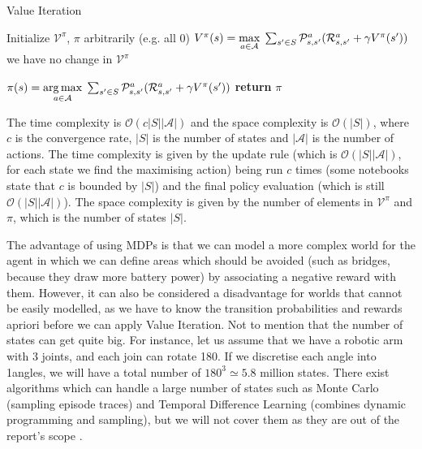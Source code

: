 \begin{algorithm}
\caption{Value Iteration}
\label{alg: value_iteration}
\begin{algorithmic}[1]
    \State Initialize $\mathcal{V^{\pi}}$, $\pi$ arbitrarily (e.g. all 0)
    \State
    \Repeat
            \State $V^{\pi}(s) = \underset{a \in \mathcal{A}}{\max} \hspace{0.1cm} \sum_{s' \in S} \mathcal{P}_{s, s'}^a (\mathcal{R}_{s, s'}^a + \gamma V^{\pi}(s'))$
        \EndFor
    \Until we have no change in $\mathcal{V^{\pi}}$
    \State
    
        \State $\pi(s) = \underset{a \in \mathcal{A}}{\arg \max} \hspace{0.1cm} \sum_{s' \in S} \mathcal{P}_{s, s'}^a (\mathcal{R}_{s, s'}^a + \gamma V^{\pi}(s'))$
    \EndFor
    \State \textbf{return} $\pi$
\EndProcedure
\end{algorithmic}
\end{algorithm}

The time complexity is $\mathcal{O}(c|S||\mathcal{A}|)$ and the space complexity is $\mathcal{O}(|S|)$, where $c$ is the convergence rate, $|S|$ is the number of states and $|\mathcal{A}|$ is the number of actions. The time complexity is given by the update rule (which is $\mathcal{O}(|S||\mathcal{A}|)$, for each state we find the maximising action) being run $c$ times (some notebooks state that $c$ is bounded by $|S|$) and the final policy evaluation (which is still $\mathcal{O}(|S||\mathcal{A}|)$). The space complexity is given by the number of elements in $\mathcal{V^{\pi}}$ and $\pi$, which is the number of states $|S|$.

The advantage of using MDPs is that we can model a more complex world for the agent in which we can define areas which should be avoided (such as bridges, because they draw more battery power) by associating a negative reward with them. However, it can also be considered a disadvantage for worlds that cannot be easily modelled, as we have to know the transition probabilities and rewards apriori before we can apply Value Iteration. Not to mention that the number of states can get quite big. For instance, let us assume that we have a robotic arm with 3 joints, and each join can rotate 180\degree. If we discretise each angle into 1\degree angles, we will have a total number of $180^3 \simeq 5.8$ million states. There exist algorithms which can handle a large number of states such as Monte Carlo (sampling episode traces) and Temporal Difference Learning (combines dynamic programming and sampling), but we will not cover them as they are out of the report's scope \cite{szepesvari2010algorithms}.
